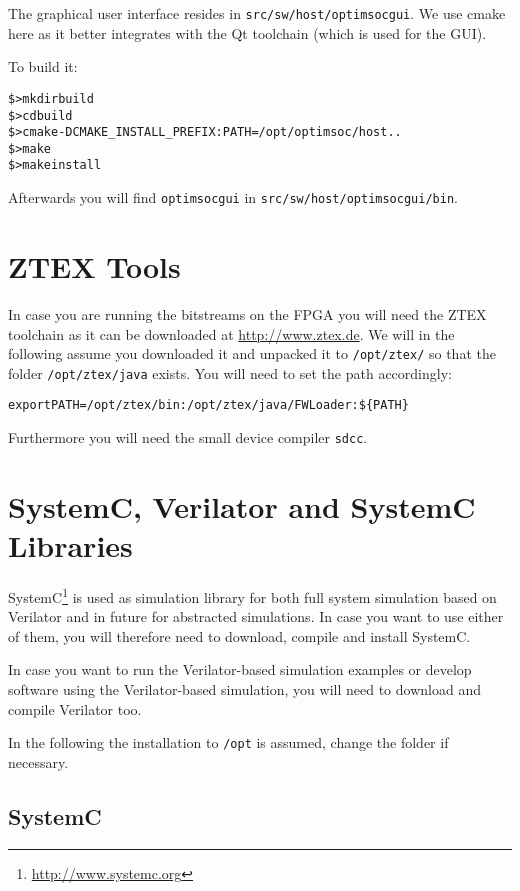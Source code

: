 The graphical user interface resides in
\verb|src/sw/host/optimsocgui|. We use cmake here as it better
integrates with the Qt toolchain (which is used for the GUI).

To build it:

\begin{alltt}
\$> mkdir build
\$> cd build
\$> cmake -DCMAKE_INSTALL_PREFIX:PATH=/opt/optimsoc/host ..
\$> make
\$> make install
\end{alltt}

Afterwards you will find \verb|optimsocgui| in
\verb|src/sw/host/optimsocgui/bin|.

\section{ZTEX Tools}

In case you are running the bitstreams on the FPGA you will need the
ZTEX toolchain as it can be downloaded at \url{http://www.ztex.de}. We
will in the following assume you downloaded it and unpacked it to
\verb|/opt/ztex/| so that the folder \verb|/opt/ztex/java| exists. You
will need to set the path accordingly:

\begin{alltt}
export PATH=/opt/ztex/bin:/opt/ztex/java/FWLoader:\$\{PATH\}
\end{alltt}

Furthermore you will need the small device compiler \verb|sdcc|.

\section{SystemC, Verilator and SystemC Libraries}

SystemC\footnote{\url{http://www.systemc.org}} is used as simulation
library for both full system simulation based on Verilator and in
future for abstracted simulations. In case you want to use either of
them, you will therefore need to download, compile and install
SystemC.

In case you want to run the Verilator-based simulation examples or
develop software using the Verilator-based simulation, you will need
to download and compile Verilator too.

In the following the installation to \verb|/opt| is assumed, change
the folder if necessary.

\subsection{SystemC}

